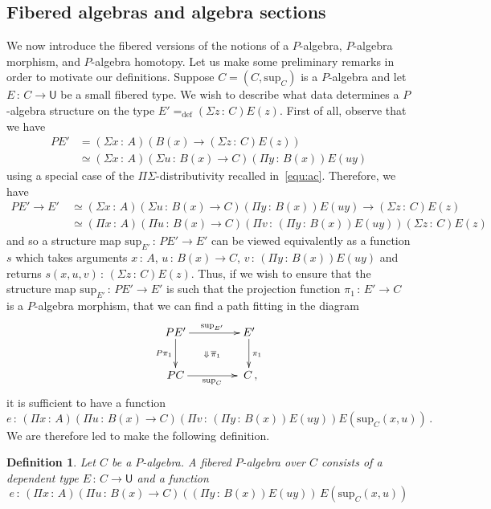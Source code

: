 \documentclass[10pt,a4paper,oneside,reqno]{amsart}
\numberwithin{equation}{section}
\theoremstyle{mythm}
\theoremstyle{mydef}
\newtheorem{definition}[theorem]{Definition}
\theoremstyle{myrmk}
\newcommand{\ie}{\text{i.e.\ }}
\newcommand{\defeq}{=_{\mathrm{def}}}
\newcommand{\co}{\,{:}\,}
\newcommand{\U}{\mathsf{U}}
\renewcommand{\sup}{\mathrm{sup}}
\begin{document}
\subsection{Fibered algebras and algebra sections} We now introduce the fibered versions of the notions of a $P$-algebra, $P$-algebra morphism, and $P$-algebra homotopy. Let us make some
preliminary remarks in order to motivate our definitions. 
Suppose $C = (C, \sup_C)$ is a $P$-algebra and let $E \co C \to \U$ be a small fibered type.
We wish to describe what data determines a $P$-algebra structure on the type $E' \defeq (\Sigma z \co C) E(z)$. First of all, observe that we have 
\begin{align*}
PE' & = (\Sigma x \co A)  (B(x) \to (\Sigma z \co C)E(z)) \\
 & \simeq (\Sigma x \co A) (\Sigma u \co B(x) \to C) (\Pi y \co B(x)) E (uy) 
\end{align*}
using a special case of the $\Pi\Sigma$-distributivity recalled in~\eqref{equ:ac}. 
Therefore, we have
\begin{align*} 
PE' \to E' \ & \simeq 
 (\Sigma x \co A) (\Sigma u \co B(x) \to C) (\Pi y \co B(x)) E (uy)  \to (\Sigma z \co C) E(z) \\ 
 & \simeq (\Pi x \co A)(\Pi u \co B(x) \to C) (\Pi v \co (\Pi y \co B(x)) E(uy)) (\Sigma z \co C) E(z) 
\end{align*}
and so a structure map $\sup_{E'} \co PE' \to E'$ can be viewed equivalently as a function $s$ which 
takes arguments $x \co A$, $u \co B(x) \to C$, $v \co (\Pi y \co B(x))E(uy)$ and returns $s(x,u,v) \co (\Sigma z \co C) E(z)$.
Thus, if we wish to ensure that the structure map $\sup_{E'} \co PE' \to E'$ is such that the projection function
 $\pi_1 \co E' \to C$ is a $P$-algebra morphism,  \ie that we can find a path fitting in the diagram
 \[
 \xymatrix@C=1.5cm{
 PE' \ar[d]_-{P \pi_1} \ar[r]^{\sup_{E'}} \ar@{}[dr]|{\Downarrow \,  \overline{\pi}_1} & E' \ar[d]^{\pi_1} \\
 PC \ar[r]_{\sup_C} & \; C \, ,}
 \]
it is sufficient to have a function
\[
e \co (\Pi x \co A)(\Pi u \co B(x) \to C) (\Pi v \co (\Pi y \co B(x)) E(uy))  E(\sup_C(x,u)) \, . 
 \]  
 We are therefore led to make the following definition. 

\begin{definition} \label{def:fibalg}
Let $C$ be a $P$-algebra. A \emph{fibered $P$-algebra} over $C$ consists of a dependent type $E \co C \to \U$
and a function 
\[
e \co  (\Pi x \co A) (\Pi u \co B(x) \to C)   ((\Pi y \co B(x))   E(u y))  \,  E(\sup_C(x,u))
 \] 
\end{definition}
\end{document}
